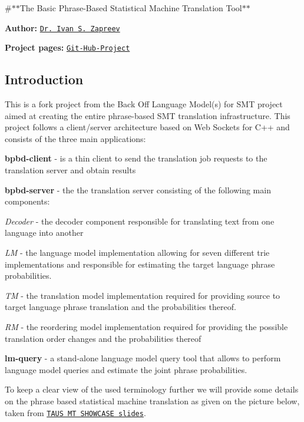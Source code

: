 \#$\ast$$\ast$\+The Basic Phrase-\/\+Based Statistical Machine Translation Tool$\ast$$\ast$

{\bfseries Author\+:} \href{https://nl.linkedin.com/in/zapreevis}{\tt Dr. Ivan S. Zapreev}

{\bfseries Project pages\+:} \href{https://github.com/ivan-zapreev/Back-Off-Language-Model-SMT}{\tt Git-\/\+Hub-\/\+Project}

\subsection*{Introduction}

This is a fork project from the Back Off Language Model(s) for S\+M\+T project aimed at creating the entire phrase-\/based S\+M\+T translation infrastructure. This project follows a client/server architecture based on Web Sockets for C++ and consists of the three main applications\+:


\begin{DoxyItemize}
\item {\bfseries bpbd-\/client} -\/ is a thin client to send the translation job requests to the translation server and obtain results
\item {\bfseries bpbd-\/server} -\/ the the translation server consisting of the following main components\+:
\begin{DoxyItemize}
\item {\itshape Decoder} -\/ the decoder component responsible for translating text from one language into another
\item {\itshape L\+M} -\/ the language model implementation allowing for seven different trie implementations and responsible for estimating the target language phrase probabilities.
\item {\itshape T\+M} -\/ the translation model implementation required for providing source to target language phrase translation and the probabilities thereof.
\item {\itshape R\+M} -\/ the reordering model implementation required for providing the possible translation order changes and the probabilities thereof
\end{DoxyItemize}
\item {\bfseries lm-\/query} -\/ a stand-\/alone language model query tool that allows to perform language model queries and estimate the joint phrase probabilities.
\end{DoxyItemize}

To keep a clear view of the used terminology further we will provide some details on the phrase based statistical machine translation as given on the picture below, taken from \href{http://www.slideshare.net/TAUS/10-april-2013-taus-mt-showcase-mt-for-southeast-asian-languages-aw-ai-ti-institute-for-infocomm-18665069}{\tt T\+A\+U\+S M\+T S\+H\+O\+W\+C\+A\+S\+E slides}.



